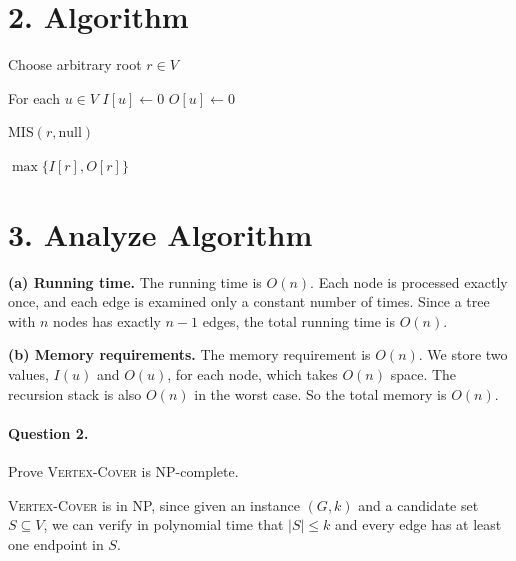 \documentclass{article}
\begin{document}
\section*{2. Algorithm}
\begin{algorithm}[H]
\caption{\textsc{MaxIndSetTree}$(T=(V,E),v)$}

Choose arbitrary root $r\in V$\;

For each $u\in V${
    $I[u]\gets 0$\;
    $O[u]\gets 0$\;
}


\textsc{MIS}$(r,\mathrm{null})$\;

\Return $\max\{I[r],O[r]\}$\;
\end{algorithm}
\section*{3. Analyze Algorithm}

\textbf{(a) Running time.}  
The running time is \(O(n)\). Each node is processed exactly once, and each edge is examined only a constant number of times. Since a tree with \(n\) nodes has exactly \(n-1\) edges, the total running time is \(O(n)\).

\medskip

\noindent \textbf{(b) Memory requirements.}  
The memory requirement is \(O(n)\). We store two values, \(I(u)\) and \(O(u)\), for each node, which takes \(O(n)\) space. The recursion stack is also \(O(n)\) in the worst case. So the total memory is \(O(n)\).

\vspace{1em}
\paragraph{Question 2.} Prove \textsc{Vertex-Cover} is NP-complete.

\textsc{Vertex-Cover} is in NP, since given an instance $(G,k)$ and a candidate set $S\subseteq V$, we can verify in polynomial time that $|S|\le k$ and every edge has at least one endpoint in $S$.
\end{document}
